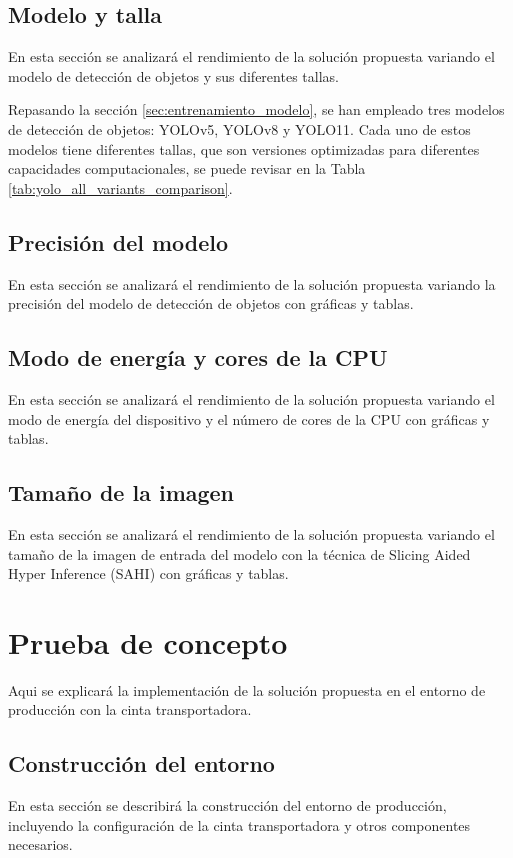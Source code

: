 \documentclass[11pt,spanish,listoffigures,listoftables]{tfgetsinf}
\begin{document}
\section{Modelo y talla} \label{sub:modelo_talla}
En esta sección se analizará el rendimiento de la solución propuesta variando el modelo de detección de objetos y sus diferentes tallas.

Repasando la sección \ref{sec:entrenamiento_modelo}, se han empleado tres modelos de detección de objetos: YOLOv5, YOLOv8 y YOLO11. Cada uno de estos modelos tiene diferentes tallas, que son versiones optimizadas para diferentes capacidades computacionales, se puede revisar en la Tabla \ref{tab:yolo_all_variants_comparison}.

\section{Precisión del modelo} \label{sub:precision_modelo}
En esta sección se analizará el rendimiento de la solución propuesta variando la precisión del modelo de detección de objetos con gráficas y tablas.

\section{Modo de energía y cores de la CPU} \label{sub:modo_energia}
En esta sección se analizará el rendimiento de la solución propuesta variando el modo de energía del dispositivo y el número de cores de la CPU con gráficas y tablas.

\section{Tamaño de la imagen} \label{sub:talla_imagen}
En esta sección se analizará el rendimiento de la solución propuesta variando el tamaño de la imagen de entrada del modelo con la técnica de Slicing Aided Hyper Inference (SAHI) con gráficas y tablas.
 
\chapter{Prueba de concepto} \label{ch:prueba_concepto}
Aqui se explicará la implementación de la solución propuesta en el entorno de producción con la cinta transportadora.

\section{Construcción del entorno} \label{sub:construccion_entorno}
En esta sección se describirá la construcción del entorno de producción, incluyendo la configuración de la cinta transportadora y otros componentes necesarios.
\end{document}
